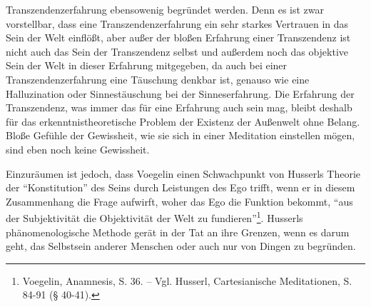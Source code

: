 Transzendenzerfahrung ebensowenig begründet werden. Denn es ist zwar
vorstellbar, dass eine Transzendenzerfahrung ein sehr starkes Vertrauen in das
Sein der Welt einflößt, aber außer der bloßen Erfahrung einer Transzendenz ist
nicht auch das Sein der Transzendenz selbst und außerdem noch das objektive
Sein der Welt in dieser Erfahrung mitgegeben, da auch bei einer
Transzendenzerfahrung eine Täuschung denkbar ist, genauso wie eine
Halluzination oder Sinnestäuschung bei der Sinneserfahrung. Die Erfahrung der
Transzendenz, was immer das für eine Erfahrung auch sein mag, bleibt deshalb
für das erkenntnistheoretische Problem der Existenz der Außenwelt ohne Belang.
Bloße Gefühle der Gewissheit, wie sie sich in einer Meditation einstellen
mögen, sind eben noch keine Gewissheit.

Einzuräumen ist jedoch, dass Voegelin einen Schwachpunkt von Husserls Theorie
der "`Konstitution"' des Seins durch Leistungen des Ego trifft, wenn er in
diesem Zusammenhang die Frage aufwirft, woher das Ego die Funktion bekommt,
"`aus der Subjektivität die Objektivität der Welt zu
fundieren"'\footnote{Voegelin, Anamnesis, S. 36. -- Vgl. Husserl,
  Cartesianische Meditationen, S. 84-91 (§ 40-41).}. Husserls
phänomenologische Methode gerät in der Tat an ihre Grenzen, wenn es darum
geht, das Selbstsein anderer Menschen oder auch nur von Dingen zu begründen.












